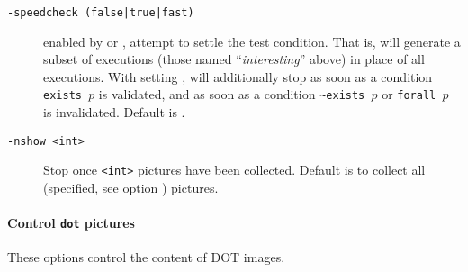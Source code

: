 \begin{description}
\item[{\tt -speedcheck (false|true|fast)}]
 enabled by 
or , attempt to settle the test condition.
That is, \herd{} will
generate a subset of executions (those named ``\emph{interesting}'' above)
in place of all executions.
With setting ,
\herd{} will additionally stop as soon as a condition \verb+exists +$p$ is validated, and as soon as a condition \verb+~exists +$p$ or
\verb+forall +$p$ is invalidated. Default is .

\item[{\tt -nshow <int>}]
Stop once \verb+<int>+ pictures have been collected. Default is to
collect all (specified, see option ) pictures.
\end{description}

\paragraph*{Control \texttt{dot} pictures}
These options control the content of DOT images.

